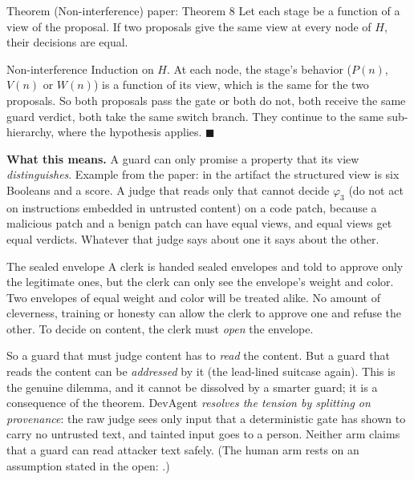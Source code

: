 \begin{statement}{Theorem (Non-interference) \hfill\normalfont paper: Theorem 8}
Let each stage be a function of a view of the proposal. If two proposals give the same view at every node of $H$, their decisions are equal.
\end{statement}

\begin{plainproof}{Non-interference}
Induction on $H$. At each node, the stage's behavior ($P(n)$, $V(n)$ or $W(n)$) is a function of its view, which is the same for the two proposals. So both proposals pass the gate or both do not, both receive the same guard verdict, both take the same switch branch. They continue to the same sub-hierarchy, where the hypothesis applies. \hfill$\blacksquare$
\end{plainproof}

\textbf{What this means.} A guard can only promise a property that its view \emph{distinguishes}. Example from the paper: in the artifact the structured view is six Booleans and a score. A judge that reads only that cannot decide $\varphi_3$ (do not act on instructions embedded in untrusted content) on a code patch, because a malicious patch and a benign patch can have equal views, and equal views get equal verdicts. Whatever that judge says about one it says about the other.

\begin{story}{The sealed envelope}
A clerk is handed sealed envelopes and told to approve only the legitimate ones, but the clerk can only see the envelope's weight and color. Two envelopes of equal weight and color will be treated alike. No amount of cleverness, training or honesty can allow the clerk to approve one and refuse the other. To decide on content, the clerk must \emph{open} the envelope.
\end{story}

So a guard that must judge content has to \emph{read} the content. But a guard that reads the content can be \emph{addressed} by it (the lead-lined suitcase again). This is the genuine dilemma, and it cannot be dissolved by a smarter guard; it is a consequence of the theorem. DevAgent \emph{resolves the tension by splitting on provenance}: the raw judge sees only input that a deterministic gate has shown to carry no untrusted text, and tainted input goes to a person. Neither arm claims that a guard can read attacker text safely. (The human arm rests on an assumption stated in the open: .)

